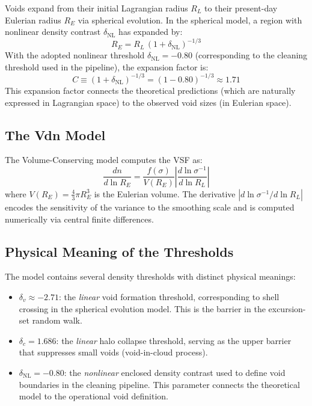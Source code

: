 \documentclass[12pt]{report}
\begin{document}
Voids expand from their initial Lagrangian radius $R_L$ to their present-day Eulerian radius $R_E$ via spherical evolution. In the spherical model, a region with nonlinear density contrast $\delta_\mathrm{NL}$ has expanded by:
\begin{equation}
    R_E = R_L\,(1 + \delta_\mathrm{NL})^{-1/3}
    \label{eq:lag_to_eul}
\end{equation}
With the adopted nonlinear threshold $\delta_\mathrm{NL} = -0.80$ (corresponding to the cleaning threshold used in the pipeline), the expansion factor is:
\begin{equation}
    C \equiv (1 + \delta_\mathrm{NL})^{-1/3} = (1 - 0.80)^{-1/3} \approx 1.71
\end{equation}
This expansion factor connects the theoretical predictions (which are naturally expressed in Lagrangian space) to the observed void sizes (in Eulerian space).

\subsection{The Vdn Model}

The Volume-Conserving model \citep{Jennings2013} computes the VSF as:
\begin{equation}
    \frac{dn}{d\ln R_E} = \frac{f(\sigma)}{V(R_E)}\left|\frac{d\ln\sigma^{-1}}{d\ln R_L}\right|
    \label{eq:vdn}
\end{equation}
where $V(R_E) = \frac{4}{3}\pi R_E^3$ is the Eulerian volume. The derivative $|d\ln\sigma^{-1}/d\ln R_L|$ encodes the sensitivity of the variance to the smoothing scale and is computed numerically via central finite differences.

\subsection{Physical Meaning of the Thresholds}
\label{sec:thresholds}

The model contains several density thresholds with distinct physical meanings:

\begin{itemize}
    \item $\delta_v \approx -2.71$: the \emph{linear} void formation threshold, corresponding to shell crossing in the spherical evolution model. This is the barrier in the excursion-set random walk.

    \item $\delta_c = 1.686$: the \emph{linear} halo collapse threshold, serving as the upper barrier that suppresses small voids (void-in-cloud process).

    \item $\delta_\mathrm{NL} = -0.80$: the \emph{nonlinear} enclosed density contrast used to define void boundaries in the cleaning pipeline. This parameter connects the theoretical model to the operational void definition.
\end{itemize}
\end{document}
